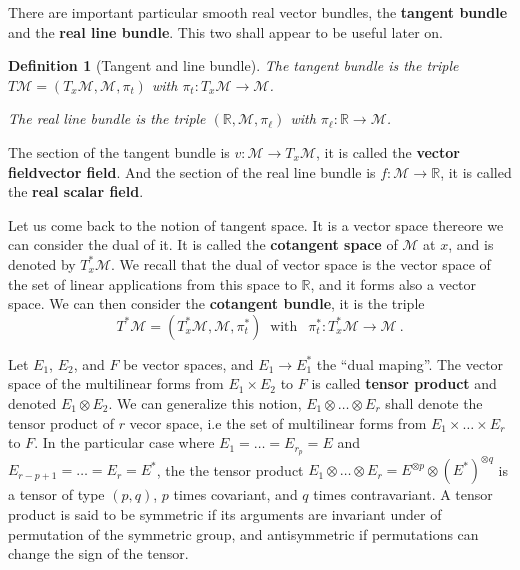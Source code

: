 \documentclass[10pt]{book}
\newcommand{\Mcal}{\mathcal{M}}
\newcommand{\Rbb}{\mathbb{R}}
\theoremstyle{break}
\newtheorem{definition}{Definition}
\begin{document}
There are important particular smooth real vector bundles, the \textbf{tangent bundle} and the \textbf{real line bundle}. This two shall appear to be useful later on.


\begin{definition}[Tangent and line bundle]
The tangent bundle is the triple $T\Mcal=(T_x\Mcal, \Mcal, \pi_t)$ with $\pi_t : T_x\Mcal \to \Mcal$. \par%
The real line bundle is the triple $(\Rbb, \Mcal, \pi_\ell)$ with $\pi_\ell : \Rbb \to \Mcal$. 
\end{definition}


The section of the tangent bundle is $v : \Mcal \to T_x\Mcal$, it is called the \textbf{vector field}\textbf{vector field}. And the section of the real line bundle is $f : \Mcal \to \Rbb$, it is called the \textbf{real scalar field}.


\bigskip


Let us come back to the notion of tangent space. It is a vector space thereore we can consider the dual of it. It is called the \textbf{cotangent space} of $\Mcal$ at $x$, and is denoted by $T^\ast_x\Mcal$. We recall that the dual of vector space is the vector space of the set of linear applications from this space to $\Rbb$, and it forms also a vector space. We can then consider the \textbf{cotangent bundle}, it is the triple
%
\begin{equation*}
T^\ast\Mcal=(T^\ast_x\Mcal, \Mcal, \pi^\ast_t) \ \mbox{ with } \ \ \pi^\ast_t : T^\ast_x\Mcal \to \Mcal \ .
\end{equation*}

Let $E_1$, $E_2$, and $F$ be vector spaces, and $E_1 \to E_1^\ast$ the ``dual maping''. The vector space of the multilinear forms from $E_1 \times E_2$ to $F$ is called \textbf{tensor product} and denoted $E_1 \otimes E_2$. We can generalize this notion, $E_1 \otimes \dots \otimes E_r$ shall denote the tensor product of $r$ vecor space, i.e the set of multilinear forms from $E_1 \times \dots \times E_r$ to $F$. In the particular case where $E_1 = \dots = E_{r_p} = E$ and $E_{r-p+1} = \dots = E_r = E^\ast$, the the tensor product $E_1 \otimes \dots \otimes E_r = E^{\otimes p} \otimes (E^\ast)^{\otimes q}$ is a tensor of type $(p,q)$, $p$ times covariant, and $q$ times contravariant. A tensor product is said to be symmetric if its arguments are invariant under of permutation of the symmetric group, and antisymmetric if permutations can change the sign of the tensor.
\end{document}
